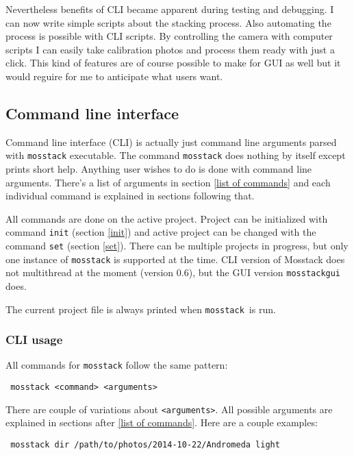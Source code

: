 \documentclass[twoside,a4paper]{refart}
\begin{document}
Nevertheless benefits of CLI became apparent during testing and debugging. I can now write simple scripts about the
stacking process. Also automating the process is possible with CLI scripts. By controlling the camera with computer
scripts I can easily take calibration photos and process them ready with just a click. This kind of features are of course 
possible to make for GUI as well but it would reguire for me to anticipate what users want.

\subsection{Command line interface}
\label{cli}

Command line interface (CLI) is actually just command line arguments parsed with \texttt{mosstack} executable. The command
\texttt{mosstack} does nothing by itself except prints short help. Anything user wishes to do is done with command line
arguments. There's a list of arguments in section \ref{list of commands} and each individual command is explained in sections
following that.

All commands are done on the active project. Project can be initialized with command \texttt{init} (section \ref{init}) and
active project can be changed with the command \texttt{set} (section \ref{set}). There can be multiple projects in progress,
but only one instance of \texttt{mosstack} is supported at the time. CLI version of Mosstack does not multithread at the
moment (version 0.6), but the GUI version \texttt{mosstackgui} does.

The current project file is always printed when \texttt{mosstack} is run.

\subsubsection{CLI usage}
\label{cli usage}

All commands for \texttt{mosstack} follow the same pattern:

\begin{verbatim}
 mosstack <command> <arguments>
\end{verbatim}

There are couple of variations about \texttt{<arguments>}. All possible arguments are explained in sections after \ref{list of commands}.
Here are a couple examples:
 
\begin{verbatim}
 mosstack dir /path/to/photos/2014-10-22/Andromeda light
\end{verbatim}
\end{document}
